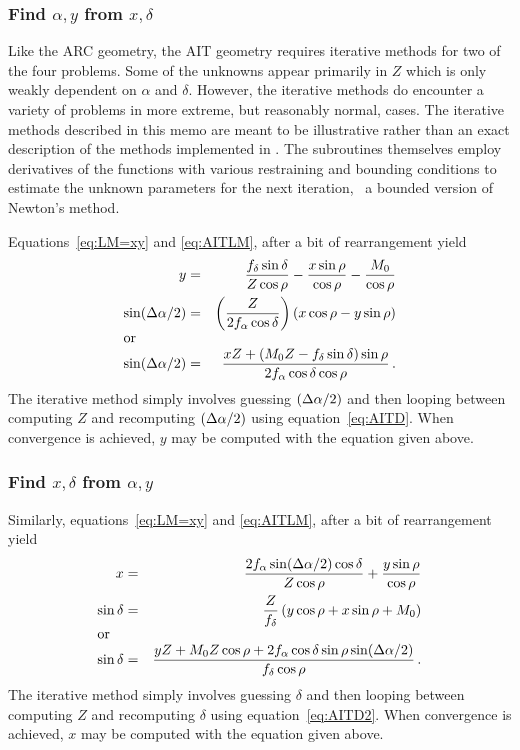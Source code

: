 \subsubsection{Find $\alpha,y$ from $x,\delta$}

     Like the ARC geometry, the AIT geometry requires iterative
methods for two of the four problems.  Some of the unknowns appear
primarily in $Z$ which is only weakly dependent on $\alpha$ and
$\delta$.  However, the iterative methods do encounter a variety of
problems in more extreme, but reasonably normal, cases.  The iterative
methods described in this memo are meant to be illustrative rather
than an exact description of the methods implemented in \AIPS.  The
subroutines themselves employ derivatives of the functions with
various restraining and bounding conditions to estimate the unknown
parameters for the next iteration, \ie\ a bounded version of Newton's
method.

Equations~\ref{eq:LM=xy} and \ref{eq:AITLM}, after a bit of
rearrangement yield
\begin{eqnarray}
   y        & = &\frac{\fd\sin\delta}{Z\cos\rho} -
                  \frac{x\sin\rho}{\cos\rho} - \frac{M_0}{\cos\rho}
                  \nonumber \\
   \sin\hda & = &\left(\frac{Z}{2\fa\cos\delta}\right)(x\cos\rho
                   -y\sin\rho) \nonumber \\
\noalign{\hbox{or}}
   \sin\hda & = &\frac{xZ + (M_0Z - \fd\sin\delta)\sin\rho}{2\fa
                   \cos\delta\cos\rho} \, . \label{eq:AITD}
\end{eqnarray}
The iterative method simply involves guessing $(\Delta\alpha/2)$ and then looping
between computing $Z$ and recomputing $(\Delta\alpha/2)$ using
equation~\ref{eq:AITD}. When convergence is achieved, $y$ may be
computed with the equation given above.

\subsubsection{Find $x,\delta$ from $\alpha,y$}

     Similarly, equations~\ref{eq:LM=xy} and \ref{eq:AITLM}, after a
bit of rearrangement yield
\begin{eqnarray}
   x          & = &\frac{2\fa\sin\hda\cos\delta}{Z\cos\rho} +
                     \frac{y\sin\rho}{\cos\rho} \nonumber \\
   \sin\delta & = &\frac{Z}{\fd} \left(y\cos\rho+x\sin\rho+M_0\right)
                     \nonumber \\
\noalign{\hbox{or}}
   \sin\delta & = &\frac{yZ + M_0Z\cos\rho + 2\fa\cos\delta\sin\rho
                     \sin\hda}{\fd\cos\rho} \, . \label{eq:AITD2}
\end{eqnarray}
The iterative method simply involves guessing $\delta$ and then
looping between computing $Z$ and recomputing $\delta$ using
equation~\ref{eq:AITD2}.  When convergence is achieved, $x$ may be
computed with the equation given above.

